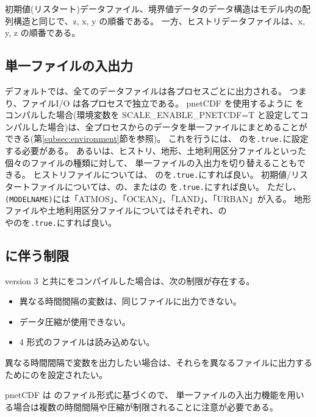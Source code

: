 初期値(リスタート)データファイル、境界値データのデータ構造はモデル内の配列構造と同じで、z, x, y の順番である。
一方、ヒストリデータファイルは、x, y, z の順番である。

\subsection{単一ファイルの入出力} \label{subsec:single_io}
デフォルトでは、全てのデータファイルは各プロセスごとに出力される。
つまり、ファイルI/O は各プロセスで独立である。
pnetCDF を使用するように \scalerm をコンパルした場合(環境変数を SCALE\_ENABLE\_PNETCDF=T と設定してコンパルした場合)は、全プロセスからのデータを単一ファイルにまとめることができる(第\ref{subsec:environment}節を参照)。
これを行うには、 のを\verb|.true.|に設定する必要がある。
あるいは、ヒストリ、地形、土地利用区分ファイルといった個々のファイルの種類に対して、
単一ファイルの入出力を切り替えることもできる。
ヒストリファイルについては、 のを\verb|.true.|にすれば良い。
初期値/リスタートファイルについては、の、またはの
を\verb|.true.|にすれば良い。
ただし、\verb|(MODELNAME)|には「ATMOS」、「OCEAN」、「LAND」、「URBAN」が入る。
地形ファイルや土地利用区分ファイルについてはそれぞれ、の\\やのを\verb|.true.|にすれば良い。

\subsection{ に伴う制限}
{\netcdf} version 3 と共に\scale をコンパイルした場合は、次の制限が存在する。
\begin{itemize}
\item 異なる時間間隔の変数は、同じファイルに出力できない。
\item データ圧縮が使用できない。
\item {\netcdf}4 形式のファイルは読み込めない。
\end{itemize}
異なる時間間隔で変数を出力したい場合は、それらを異なるファイルに出力するためにのを設定されたい。

pnetCDF は  のファイル形式に基づくので、
単一ファイルの入出力機能を用いる場合は複数の時間間隔や圧縮が制限されることに注意が必要である。

